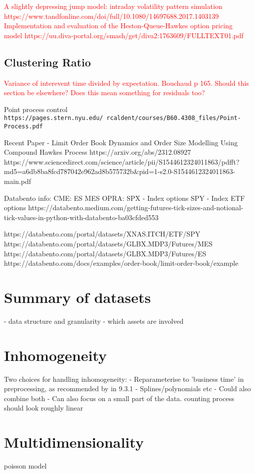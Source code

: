 \documentclass[honours,12pt]{unswthesis}
\numberwithin{equation}{section}
\begin{document}
\textcolor{red}{A slightly depressing jump model: intraday volatility pattern simulation https://www.tandfonline.com/doi/full/10.1080/14697688.2017.1403139}
\textcolor{red}{Implementation and evaluation of the Heston-Queue-Hawkes option pricing model https://uu.diva-portal.org/smash/get/diva2:1763609/FULLTEXT01.pdf}

\subsection{Clustering Ratio}
\textcolor{red}{Variance of interevent time divided by expectation. Bouchaud p 165. Should this section be elsewhere? Does this mean something for residuals too?}

Point process control \texttt{https://pages.stern.nyu.edu/~rcaldent/courses/B60.4308_files/Point-Process.pdf}


Recent Paper - Limit Order Book Dynamics and Order Size Modelling Using Compound Hawkes Process https://arxiv.org/abs/2312.08927 https://www.sciencedirect.com/science/article/pii/S1544612324011863/pdfft?md5=a6db8ba8fcd787042e962ad8b575732b&pid=1-s2.0-S1544612324011863-main.pdf


Databento info:
CME:
ES
MES
OPRA:
SPX - Index options
SPY - Index ETF options
https://databento.medium.com/getting-futures-tick-sizes-and-notional-tick-values-in-python-with-databento-ba03cfded553

https://databento.com/portal/datasets/XNAS.ITCH/ETF/SPY
https://databento.com/portal/datasets/GLBX.MDP3/Futures/MES
https://databento.com/portal/datasets/GLBX.MDP3/Futures/ES
https://databento.com/docs/examples/order-book/limit-order-book/example
\section{Summary of datasets}
- data structure and granularity
- which assets are involved

\section{Inhomogeneity}
Two choices for handling inhomogeneity:
- Reparameterise to 'business time' in preprocessing, as recommended by \cite{BouchaudEtAl} in 9.3.1
- Splines/polynomials etc
- Could also combine both
- Can also focus on a small part of the data. counting process should look roughly linear

\section{Multidimensionality}
poisson model
\end{document}
